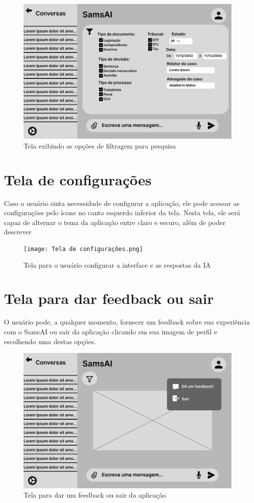 \documentclass[
	12pt,				%
	openright,			%
	oneside,			    %
	a4paper,				%
	english,			%
	french,			%
	spanish,			%
	brazil			%
	]{abntex2}
\begin{document}
\begin{figure}[h]
    \centering
    \includegraphics[width=0.8\linewidth]{Tela de Filtro.png}
    \caption{Tela exibindo as opções de filtragem para pesquisa}
    \label{fig:enter-label}
\end{figure}

\newpage
\section{Tela de configurações}
Caso o usuário sinta necessidade de configurar a aplicação, ele pode acessar as configurações pelo ícone no canto esquerdo inferior da tela. Nesta tela, ele será capaz de alternar o tema da aplicação entre claro e escuro, além de poder descrever

\begin{figure}[h!]
    \centering
    \texttt{[image: Tela de configurações.png]}
    \caption{Tela para o usuário configurar a interface e as respostas da IA}
    \label{fig:enter-label}
\end{figure}

\newpage
\section{Tela para dar feedback ou sair}
O usuário pode, a qualquer momento, fornecer um feedback sobre sua experiência com o SamsAI ou sair da aplicação clicando em sua imagem de perfil e escolhendo uma destas opções.

\begin{figure}[h!]
    \centering
    \includegraphics[width=0.8\linewidth]{Tela de feedback.png}
    \caption{Tela para dar um feedback ou sair da aplicação}
    \label{fig:enter-label}
\end{figure}
\end{document}
